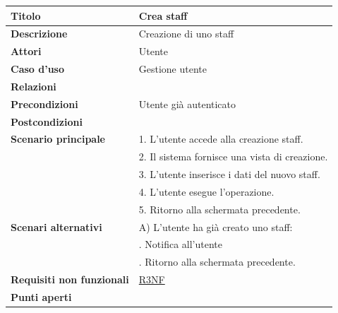 \documentclass[a4paper]{article}
\begin{document}
\begin{center}
\begin{tabularx}{1\textwidth}{|l|X|}
    \hline
		\textbf{Titolo} & Crea staff \\
		\hline
		\textbf{Descrizione} & Creazione di uno staff \\
		\hline
		\textbf{Attori} & Utente \\
		\hline
		\textbf{Caso d'uso} & Gestione utente \\
	    \hline
		\textbf{Relazioni} &  \\
		\hline
		\textbf{Precondizioni} & Utente già autenticato \\
		\hline
		\textbf{Postcondizioni} &  \\
		\hline
		\textbf{Scenario principale} & 1. L'utente accede alla creazione staff. \\
									 & 2. Il sistema fornisce una vista di creazione. \\
									 & 3. L'utente inserisce i dati del nuovo staff. \\
									 & 4. L'utente esegue l'operazione.\\
									 & 5. Ritorno alla schermata precedente.\\
		\hline
		\textbf{Scenari alternativi} & A) L'utente ha già creato uno staff: \\
									 & \quad 1. Notifica all'utente \\
									 & \quad 2. Ritorno alla schermata precedente.\\
		\hline
		\textbf{Requisiti non funzionali} & \hyperlink{R3NF}{R3NF} \\
		\hline
		\textbf{Punti aperti} & \\
		\hline
	\end{tabularx}
\end{center}

\end{document}
